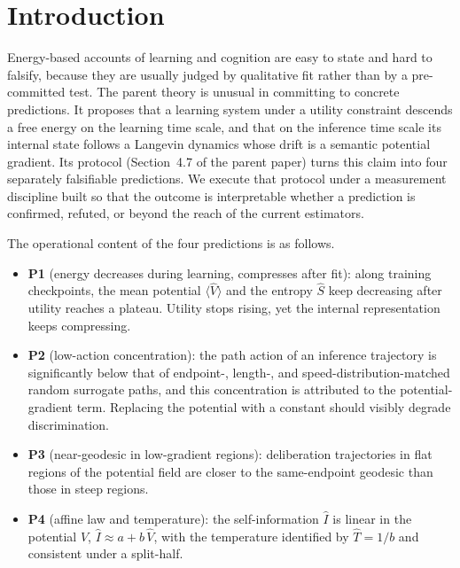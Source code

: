 \documentclass{article}
\begin{document}
\section{Introduction}

Energy-based accounts of learning and cognition are easy to state and hard to
falsify, because they are usually judged by qualitative fit rather than by a
pre-committed test. The parent theory \citep{slep_parent} is unusual in committing
to concrete predictions. It proposes that a learning system under a utility
constraint descends a free energy on the learning time scale, and that on the
inference time scale its internal state follows a Langevin dynamics whose drift is
a semantic potential gradient. Its protocol (Section~4.7 of the parent paper)
turns this claim into four separately falsifiable predictions. We execute that
protocol under a measurement discipline built so that the outcome is interpretable
whether a prediction is confirmed, refuted, or beyond the reach of the current
estimators.

The operational content of the four predictions is as follows.
\begin{itemize}
\item \textbf{P1} (energy decreases during learning, compresses after fit): along
training checkpoints, the mean potential $\langle\hat V\rangle$ and the entropy
$\hat S$ keep decreasing after utility reaches a plateau. Utility stops rising,
yet the internal representation keeps compressing.
\item \textbf{P2} (low-action concentration): the path action of an inference
trajectory is significantly below that of endpoint-, length-, and
speed-distribution-matched random surrogate paths, and this concentration is
attributed to the potential-gradient term. Replacing the potential with a
constant should visibly degrade discrimination.
\item \textbf{P3} (near-geodesic in low-gradient regions): deliberation
trajectories in flat regions of the potential field are closer to the
same-endpoint geodesic than those in steep regions.
\item \textbf{P4} (affine law and temperature): the self-information $\hat I$ is
linear in the potential $\hat V$, $\hat I \approx a + b\,\hat V$, with the
temperature identified by $\hat T = 1/b$ and consistent under a split-half.
\end{itemize}
\end{document}
